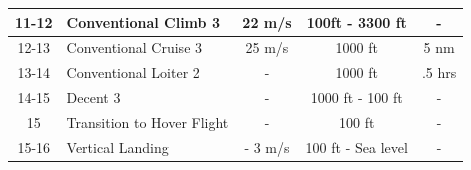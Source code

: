 \begin{table}[H]
\begin{center}
\begin{tabular}{|c|l|c|c|c|}
11-12            & Conventional Climb 3                                 & 22 m/s         &       100ft - 3300 ft & - \\\hline
12-13            & Conventional Cruise 3                    & 25 m/s       &      1000 ft              &      5 nm                 \\ \hline
13-14            & Conventional Loiter 2                                  & -              & 1000 ft           & .5 hrs               \\ \hline
14-15            & Decent 3                                  & -              & 1000 ft - 100 ft           & -             \\ \hline
15            & Transition to Hover Flight                                   & -              & 100 ft           & -             \\ \hline
15-16            & Vertical Landing                                &  - 3 m/s              & 100 ft - Sea level          & -             \\ \hline
\end{tabular}
\end{center}
\end{table}


\clearpage





